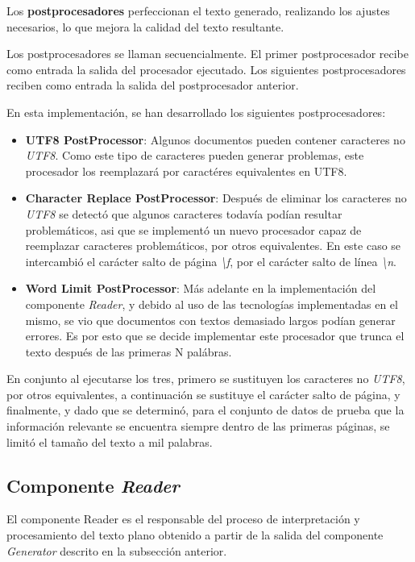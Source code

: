Los \textbf{postprocesadores} perfeccionan el texto generado, realizando los ajustes necesarios, lo que mejora la
calidad del texto resultante.

Los postprocesadores se llaman secuencialmente.
El primer postprocesador recibe como entrada la salida del procesador ejecutado.
Los siguientes postprocesadores reciben como entrada la salida del postprocesador anterior.

En esta implementación, se han desarrollado los siguientes postprocesadores:

\begin{itemize}
    \item
    \textbf{UTF8 PostProcessor}: Algunos documentos pueden contener caracteres no \textit{UTF8}.
    Como este tipo de caracteres pueden generar problemas, este procesador los reemplazará por caractéres equivalentes
    en UTF8.
    \item
    \textbf{Character Replace PostProcessor}: Después de eliminar los caracteres no \textit{UTF8} se detectó que algunos
    caracteres todavía podían resultar problemáticos, asi que se implementó un nuevo procesador capaz de reemplazar
    caracteres problemáticos, por otros equivalentes.
    En este caso se intercambió el carácter salto de página \textit{\textbackslash f}, por el carácter
    salto de línea \textit{\textbackslash n}.
    \item
    \textbf{Word Limit PostProcessor}: Más adelante en la implementación del componente \textit{Reader}, y debido al uso
    de las tecnologías implementadas en el mismo, se vio que documentos con textos demasiado largos podían generar
    errores.
    Es por esto que se decide implementar este procesador que trunca el texto después de las primeras N palábras.
\end{itemize}

En conjunto al ejecutarse los tres, primero se sustituyen los caracteres no \textit{UTF8}, por otros equivalentes, a
continuación se sustituye el carácter salto de página, y finalmente, y dado que se determinó, para el conjunto de
datos de prueba que la información relevante se encuentra siempre dentro de las primeras páginas, se limitó el
tamaño del texto a mil palabras.

\subsection*{Componente \textit{Reader}}\label{subsec:chapter_4.reader_component}
El componente Reader es el responsable del proceso de interpretación y procesamiento del texto plano obtenido a
partir de la salida del componente \textit{Generator} descrito en la subsección anterior.

